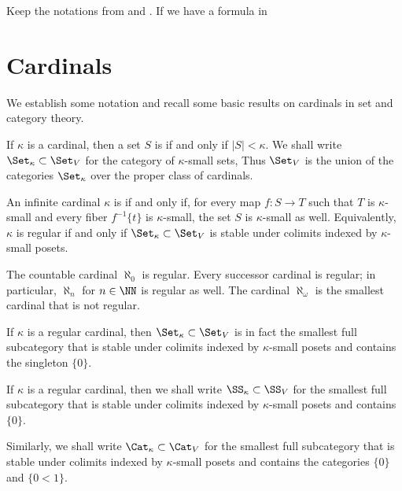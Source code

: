 \begin{eg}
	Keep the notations from  and .
	If we have a formula in 
\end{eg}

\section{Cardinals}%
\label{sec:cardinals}

We establish some notation and recall some basic results on cardinals in set and category theory.

\begin{definition}
	If $ \kappa $ is a cardinal, then a set $ S $ is  if and only if $ |S| < \kappa $.
	We shall write $ \Set_{\kappa} \subset \Set_V$ for the category of $ \kappa $-small sets,
	Thus $ \Set_V $ is the union of the categories $ \Set_{\kappa} $ over the proper class of cardinals.
	
	An infinite cardinal $ \kappa $ is  if and only if, for every map $ f \colon S \to T $ such that $ T $ is $ \kappa $-small and every fiber $ f^{-1}\{t\} $ is $ \kappa $-small, the set $ S $ is $ \kappa $-small as well.
	Equivalently, $ \kappa $ is regular if and only if $ \Set_{\kappa} \subset \Set_V $ is stable under colimits indexed by $ \kappa $-small posets.
\end{definition}

\begin{eg}
	The countable cardinal $ \aleph_0 $ is regular.
	Every successor cardinal is regular;
	in particular, $ \aleph_n $ for $ n \in \NN $ is regular as well.
	The cardinal $ \aleph_{\omega} $ is the smallest cardinal that is not regular.
\end{eg}

If $ \kappa $ is a regular cardinal, then $ \Set_{\kappa} \subset \Set_V $ is in fact the smallest full subcategory that is stable under colimits indexed by $ \kappa $-small posets and contains the singleton $ \{ 0 \}$.

\begin{definition}
	If $ \kappa $ is a regular cardinal, then we shall write $ \SS_{\kappa} \subset \SS_V $ for the smallest full subcategory that is stable under colimits indexed by $ \kappa $-small posets and contains $ \{ 0 \} $.

	Similarly, we shall write $ \Cat_{\kappa} \subset \Cat_V $ for the smallest full subcategory that is stable under colimits indexed by $ \kappa $-small posets and contains the categories $ \{ 0 \} $ and $ \{ 0 < 1 \} $.
\end{definition}


